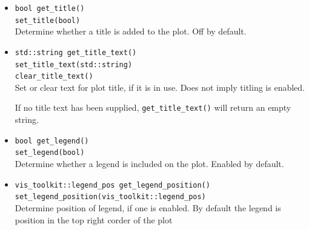 \documentclass[11pt,a4paper]{article}
\begin{document}
\begin{itemize}
    \item \texttt{bool get_title()} \\
    \texttt{set_title(bool)} \\
    Determine whether a title is added to the plot. Off by default.
    
    \item \texttt{std::string get_title_text()} \\
    \texttt{set_title_text(std::string)} \\
    \texttt{clear_title_text()} \\
    Set or clear
    text for plot title, if it is in use. Does not imply titling is enabled.
    
    If no title text has been supplied,
    \texttt{get_title_text()} will return an empty string.
    
    \item \texttt{bool get_legend()} \\
    \texttt{set_legend(bool)} \\
    Determine whether a legend is included on the plot. Enabled by default.
    
    \item \texttt{vis_toolkit::legend_pos get_legend_position()} \\
    \texttt{set_legend_position(vis_toolkit::legend_pos)} \\
    Determine position of legend, if one is enabled. By default the legend is
    position in the top right corder of the plot
    

\end{itemize}
\end{document}
